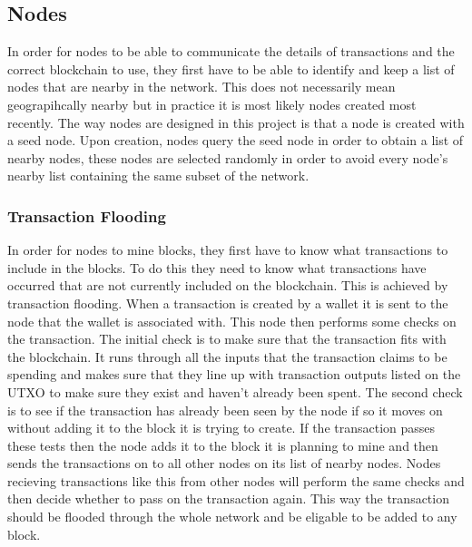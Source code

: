 \documentclass{l4proj}
\begin{document}
\subsection{Nodes}
In order for nodes to be able to communicate the details of transactions and the correct blockchain to use,
they first have to be able to identify and keep a list of nodes that are nearby in the network. This does not
necessarily mean geograpihcally nearby but in practice it is most likely nodes created most recently.
The way nodes are designed in this project is that a node is created with a seed node. Upon creation, nodes
query the seed node in order to obtain a list of nearby nodes, these nodes are selected randomly in order
to avoid every node's nearby list containing the same subset of the network.

\subsubsection{Transaction Flooding}
In order for nodes to mine blocks, they first have to know what transactions to include in the blocks. To do
this they need to know what transactions have occurred that are not currently included on the blockchain. This
is achieved by transaction flooding. When a transaction is created by a wallet it is sent to the node that the
wallet is associated with. This node then performs some checks on the transaction. The initial check is to make
sure that the transaction fits with the blockchain. It runs through all the inputs that the transaction claims
to be spending and makes sure that they line up with transaction outputs listed on the UTXO to make sure they
exist and haven't already been spent. The second check is to see if the transaction has already been seen by
the node if so it moves on without adding it to the block it is trying to create. If the transaction passes
these tests then the node adds it to the block it is planning to mine and then sends the transactions on to all
other nodes on its list of nearby nodes. Nodes recieving transactions like this from other nodes will perform the
same checks and then decide whether to pass on the transaction again. This way the transaction should be flooded
through the whole network and be eligable to be added to any block.
\end{document}
